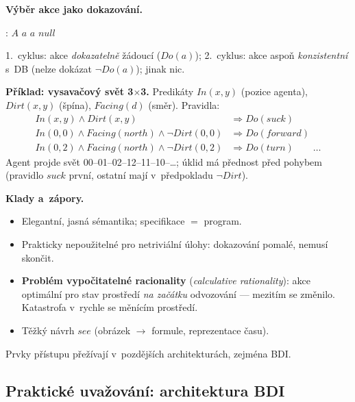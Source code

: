 \documentclass[11pt,a4paper]{article}
\theoremstyle{definition}
\begin{document}
\noindent\textbf{Výběr akce jako dokazování.}
\begin{algorithmic}[1]
 : $A$
     \Return $a$ \EndIf
  \EndFor
     \Return $a$ \EndIf
  \EndFor
  \State \Return $\mathit{null}$
\EndFunction
\end{algorithmic}

1.~cyklus: akce \emph{dokazatelně} žádoucí ($\mathit{Do}(a)$); 2.~cyklus: akce aspoň
\emph{konzistentní} s~DB (nelze dokázat $\neg\mathit{Do}(a)$); jinak nic.

\medskip
\noindent\textbf{Příklad: vysavačový svět 3$\times$3.}
Predikáty $\mathit{In}(x,y)$ (pozice agenta), $\mathit{Dirt}(x,y)$ (špína), $\mathit{Facing}(d)$
(směr). Pravidla:
\begin{align*}
\mathit{In}(x,y) \wedge \mathit{Dirt}(x,y) &\Rightarrow \mathit{Do}(\mathit{suck}) \\
\mathit{In}(0,0) \wedge \mathit{Facing}(\mathit{north}) \wedge \neg\mathit{Dirt}(0,0)
  &\Rightarrow \mathit{Do}(\mathit{forward}) \\
\mathit{In}(0,2) \wedge \mathit{Facing}(\mathit{north}) \wedge \neg\mathit{Dirt}(0,2)
  &\Rightarrow \mathit{Do}(\mathit{turn}) \qquad \dots
\end{align*}
Agent projde svět  00--01--02--12--11--10--\dots; úklid má přednost před pohybem
(pravidlo $\mathit{suck}$ první, ostatní mají v~předpokladu $\neg\mathit{Dirt}$).

\medskip
\noindent\textbf{Klady a~zápory.}
\begin{itemize}
\item[$+$] Elegantní, jasná sémantika; specifikace $=$ program.
\item[$-$] Prakticky nepoužitelné pro netriviální úlohy: dokazování pomalé, nemusí skončit.
\item[$-$] \textbf{Problém vypočitatelné racionality} (\emph{calculative rationality}): akce
  optimální pro stav prostředí \emph{na začátku} odvozování --- mezitím se změnilo. Katastrofa
  v~rychle se měnícím prostředí.
\item[$-$] Těžký návrh $\mathit{see}$ (obrázek $\to$ formule, reprezentace času).
\end{itemize}
Prvky přístupu přežívají v~pozdějších architekturách, zejména BDI.

\subsection{Praktické uvažování: architektura BDI}
\end{document}
